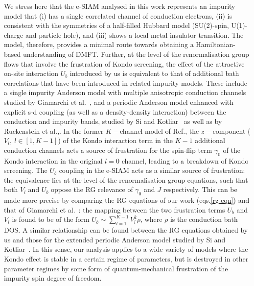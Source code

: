 \documentclass{iopart}
\begin{document}
We stress here that the e-SIAM analysed in this work represents an impurity model that (i) has a single correlated channel of conduction electrons, (ii) is consistent with the symmetries of a half-filled Hubbard model (SU(2)-spin, U(1)-charge and particle-hole), and (iii) shows a local metal-insulator transition. The model, therefore, provides a minimal route towards obtaining a Hamiltonian-based understanding of DMFT. Further, at the level of the renormalisation group flows that involve the frustration of Kondo screening, the effect of the attractive on-site interaction \(U_b\) introduced by us is equivalent to that of additional bath correlations that have been introduced in related impurity models. These include a single impurity Anderson model with multiple anisotropic conduction channels studied by Giamarchi et al.~\cite{giamarchi_varma_1993}, and a periodic Anderson model enhanced with explicit s-d coupling (as well as a density-density interaction) between the conduction and impurity bands, studied by Si and Kotliar~\cite{si_kotliar_1993,kotliar_si_toulouse_1996,Si_kotliar_NFL_1993} as well as by Ruckenstein et al.,\cite{ruckenstein1991}. In the former \(K-\)channel model of Ref.\cite{giamarchi_varma_1993}, the \(z-\)component (\(V_l, ~ l\in\left[1, K-1\right] \)) of the Kondo interaction term in the \(K-1\) additional conduction channels acts a source of frustration for the spin-flip term \(\gamma_0\) of the Kondo interaction in the original \(l=0\) channel, leading to a breakdown of Kondo screening. The \(U_b\) coupling in the e-SIAM acts as a similar source of frustration: the equivalence lies at the level of the renormalisation group equations, such that both \(V_l\) and \(U_b\) oppose the RG relevance of \(\gamma_0\) and \(J\) respectively. This can be made more precise by comparing the RG equations of our work (eqs.\eqref{rg-eqn}) and that of Giamarchi et al.~\cite{giamarchi_varma_1993}: the mapping between the two frustration terms \(U_b \) and \(V_l\) is found to be of the form \(U_b \sim \sum_{l=1}^{K-1}V_l^2 \rho\), where \(\rho\) is the conduction bath DOS. A similar relationship can be found between the RG equations obtained by us and those for the extended periodic Anderson model studied by Si and Kotliar~\cite{si_kotliar_1993}. In this sense, our analysis applies to a wide variety of models where the Kondo effect is stable in a certain regime of  parameters, but is destroyed in other parameter regimes by some form of quantum-mechanical frustration of the impurity spin degree of freedom. 
\end{document}

